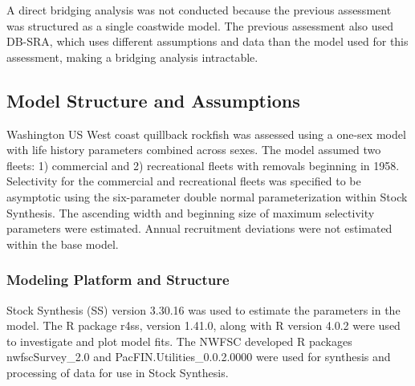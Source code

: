 \documentclass[11pt,
  english,
  a4paper,
]{article}
\begin{document}
\leavevmode\tagmcend\tagstructend


A direct bridging analysis was not conducted because the previous assessment was structured as a single coastwide model. The previous assessment also used DB-SRA, which uses different assumptions and data than the model used for this assessment, making a bridging analysis intractable.

\leavevmode\tagmcend\tagstructend\par


\hypertarget{model-structure-and-assumptions}{%
\subsection{Model Structure and Assumptions}\label{model-structure-and-assumptions}}

\leavevmode\tagmcend\tagstructend


Washington US West coast quillback rockfish was assessed using a one-sex model with life history parameters combined across sexes. The model assumed two fleets: 1) commercial and 2) recreational fleets with removals beginning in 1958. Selectivity for the commercial and recreational fleets was specified to be asymptotic using the six-parameter double normal parameterization within Stock Synthesis. The ascending width and beginning size of maximum selectivity parameters were estimated. Annual recruitment deviations were not estimated within the base model.

\leavevmode\tagmcend\tagstructend\par


\hypertarget{modeling-platform-and-structure}{%
\subsubsection{Modeling Platform and Structure}\label{modeling-platform-and-structure}}

\leavevmode\tagmcend\tagstructend


Stock Synthesis (SS) version 3.30.16 was used to estimate the parameters in the model. The R package r4ss, version 1.41.0, along with R version 4.0.2 were used to investigate and plot model fits. The NWFSC developed R packages nwfscSurvey\_2.0 and PacFIN.Utilities\_0.0.2.0000 were used for synthesis and processing of data for use in Stock Synthesis.
\end{document}
